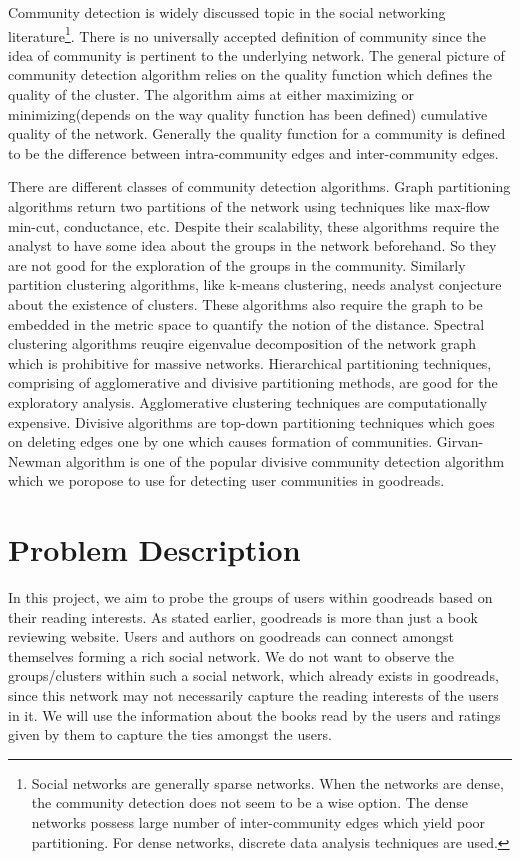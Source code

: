 \documentclass[11pt]{article}
\begin{document}
Community detection is widely discussed topic in the social networking literature\footnote{Social networks are generally sparse networks. When the networks are dense, the community detection does not seem to be a wise option. The dense networks possess large number of inter-community edges which yield poor partitioning. For dense networks, discrete data analysis techniques are used.}\cite{clauset}. There is no universally accepted definition of community since the idea of community is pertinent to the underlying network. The general picture of community detection algorithm relies on the quality function which defines the quality of the cluster. The algorithm aims at either maximizing or minimizing(depends on the way quality function has been defined) cumulative quality of the network. Generally the quality function for a community is defined to be the difference between intra-community edges and inter-community edges.

There are different classes of community detection algorithms. Graph partitioning algorithms return two partitions of the network using techniques like max-flow min-cut, conductance, etc. Despite their scalability, these algorithms require the analyst to have some idea about the groups in the network beforehand. So they are not good for the exploration of the groups in the community. Similarly partition clustering algorithms, like k-means clustering, needs analyst conjecture about the existence of clusters. These algorithms also require the graph to be embedded in the metric space to quantify the notion of the distance. Spectral clustering algorithms reuqire eigenvalue decomposition of the network graph which is prohibitive for massive networks. Hierarchical partitioning techniques, comprising of agglomerative and divisive partitioning methods, are good for the exploratory analysis. Agglomerative clustering techniques are computationally expensive. Divisive algorithms are top-down partitioning techniques which goes on deleting edges one by one which causes formation of communities. Girvan-Newman algorithm is one of the popular divisive community detection algorithm which we poropose to use for detecting user communities in goodreads.


\section{Problem Description}
In this project, we aim to probe the groups of users within goodreads based on their reading interests. As stated earlier, goodreads is more than just a book reviewing website. Users and authors on goodreads can connect amongst themselves forming a rich social network. We do not want to observe the groups/clusters within such a social network, which already exists in goodreads, since this network may not necessarily capture the reading interests of the users in it. We will use the information about the books read by the users and ratings given by them to capture the ties amongst the users.\\
\end{document}
